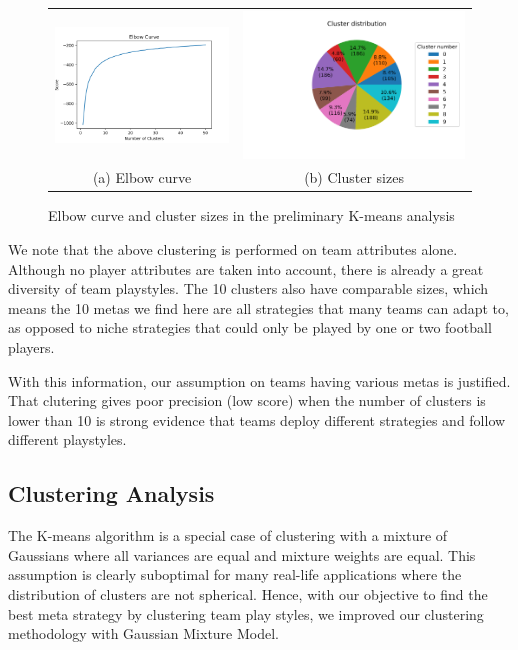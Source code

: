 \documentclass{article}
\begin{document}
\begin{figure}[H]
\centering
\begin{tabular}{cc}
\includegraphics[width=70mm]{k-means_graphs/Elbow.png} &
\includegraphics[width=90mm]{k-means_graphs/10clusters.png} \\
(a) Elbow curve & (b) Cluster sizes \\
\end{tabular}
\caption{Elbow curve and cluster sizes in the preliminary K-means analysis}
\label{fig:elbow}
\end{figure}

We note that the above clustering is performed on team attributes alone. Although no player attributes are taken into account, there is already a great diversity of team playstyles. The 10 clusters also have comparable sizes, which means the 10 metas we find here are all strategies that many teams can adapt to, as opposed to niche strategies that could only be played by one or two football players.

With this information, our assumption on teams having various metas is justified. That clutering gives poor precision (low score) when the number of clusters is lower than 10 is strong evidence that teams deploy different strategies and follow different playstyles. 

\subsection{Clustering Analysis}
The K-means algorithm is a special case of clustering with a mixture of Gaussians where all variances are equal and mixture weights are equal. This assumption is clearly suboptimal for many real-life applications where the distribution of clusters are not spherical. Hence, with our objective to find the best meta strategy by clustering team play styles, we improved our clustering methodology with Gaussian Mixture Model.
\end{document}
